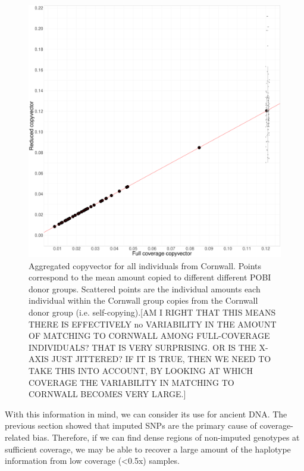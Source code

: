 \begin{figure}[htp]
    \centering
    \includegraphics[width=1.0\textwidth]{../images/chapter1/dense_sparse_devon_cornwall_collapsed_scatterpoints.pdf}
    \caption{Aggregated copyvector for all individuals from Cornwall. Points correspond to the mean amount copied to different different POBI donor groups. Scattered points are the individual amounts each individual within the Cornwall group copies from the Cornwall donor group (i.e. self-copying).{\color{red}[AM I RIGHT THAT THIS MEANS THERE IS EFFECTIVELY no VARIABILITY IN THE AMOUNT OF MATCHING TO CORNWALL AMONG FULL-COVERAGE INDIVIDUALS? THAT IS VERY SURPRISING. OR IS THE X-AXIS JUST JITTERED? IF IT IS TRUE, THEN WE NEED TO TAKE THIS INTO ACCOUNT, BY LOOKING AT WHICH COVERAGE THE VARIABILITY IN MATCHING TO CORNWALL BECOMES VERY LARGE.]}}
    \label{fig:dense_sparse_devon_cornwall_collapsed_scatterpoints}
\end{figure}

With this information in mind, we can consider its use for ancient DNA. The previous section showed that imputed SNPs are the primary cause of coverage-related bias. Therefore, if we can find dense regions of non-imputed genotypes at sufficient coverage, we may be able to recover a large amount of the haplotype information from low coverage (<0.5x) samples.

